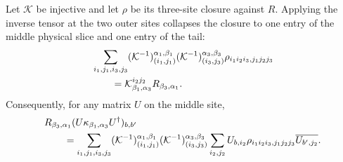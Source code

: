 \begin{lemma}
    \label{thm:mpdo_closure_outer_contraction}
    \leanok
    Let $\mathcal K$ be injective and let $\rho$ be its three-site closure
    against $R$. Applying the inverse tensor at the two outer sites collapses
    the closure to one entry of the middle physical slice and one entry of the
    tail:
    \begin{align}
         & \sum_{i_1,j_1,i_3,j_3}
        (\mathcal K^{-1})^{\alpha_1,\beta_1}_{(i_1,j_1)}
        (\mathcal K^{-1})^{\alpha_3,\beta_3}_{(i_3,j_3)}
        \rho_{i_1i_2i_3,j_1j_2j_3}
        \notag                    \\
         & \qquad
        =\mathcal K^{i_2j_2}_{\beta_1,\alpha_3}
        R_{\beta_3,\alpha_1}.
        \label{eq:rfp_outer_collapse}
    \end{align}
    Consequently, for any matrix $U$ on the middle site,
    \begin{align}
         & R_{\beta_3,\alpha_1}
        (U\kappa_{\beta_1,\alpha_3}U^\dagger)_{b,b'}
        \notag                  \\
         & \qquad
        =\sum_{i_1,j_1,i_3,j_3}
        (\mathcal K^{-1})^{\alpha_1,\beta_1}_{(i_1,j_1)}
        (\mathcal K^{-1})^{\alpha_3,\beta_3}_{(i_3,j_3)}
        \sum_{i_2,j_2}
        U_{b,i_2} \rho_{i_1i_2i_3,j_1j_2j_3}
        \overline{U_{b',j_2}}.
        \label{eq:rfp_conjugated_slice}
    \end{align}
\end{lemma}


